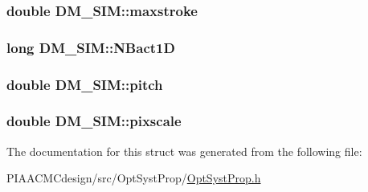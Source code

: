 \hypertarget{structDM__SIM_abecbaa72dee8fc92256ae7368e4f48fb}{
\subsubsection[{maxstroke}]{\setlength{\rightskip}{0pt plus 5cm}double D\+M\+\_\+\+S\+I\+M\+::maxstroke}}\label{structDM__SIM_abecbaa72dee8fc92256ae7368e4f48fb}
\hypertarget{structDM__SIM_a2ce1ee098755e4e7996951cd71d8976b}{
\subsubsection[{N\+Bact1\+D}]{\setlength{\rightskip}{0pt plus 5cm}long D\+M\+\_\+\+S\+I\+M\+::\+N\+Bact1\+D}}\label{structDM__SIM_a2ce1ee098755e4e7996951cd71d8976b}
\hypertarget{structDM__SIM_ade1c585e1ec4dff6446ba9e8349082d0}{
\subsubsection[{pitch}]{\setlength{\rightskip}{0pt plus 5cm}double D\+M\+\_\+\+S\+I\+M\+::pitch}}\label{structDM__SIM_ade1c585e1ec4dff6446ba9e8349082d0}
\hypertarget{structDM__SIM_a88f9258d3a795e433186d8ae4b77a418}{
\subsubsection[{pixscale}]{\setlength{\rightskip}{0pt plus 5cm}double D\+M\+\_\+\+S\+I\+M\+::pixscale}}\label{structDM__SIM_a88f9258d3a795e433186d8ae4b77a418}


The documentation for this struct was generated from the following file\+:\begin{DoxyCompactItemize}
\item 
P\+I\+A\+A\+C\+M\+Cdesign/src/\+Opt\+Syst\+Prop/\hyperlink{PIAACMCdesign_2src_2OptSystProp_2OptSystProp_8h}{Opt\+Syst\+Prop.\+h}\end{DoxyCompactItemize}
